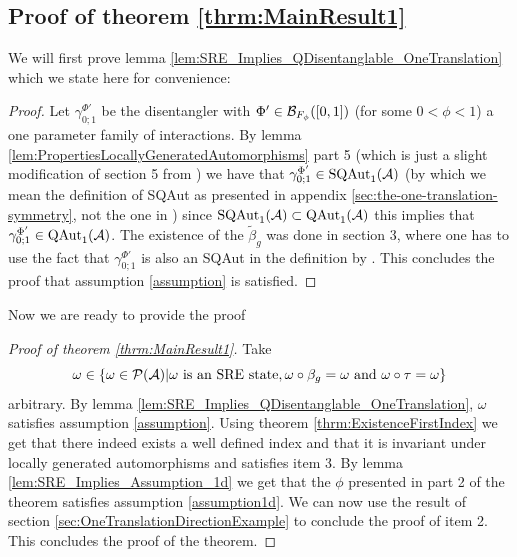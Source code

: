 \documentclass[12pt,a4paper,twoside]{article}
\numberwithin{equation}{section}
\begin{document}
\subsection{Proof of theorem \ref{thrm:MainResult1}}\label{sec:ProofOfMainResult1}
We will first prove lemma \ref{lem:SRE_Implies_QDisentanglable_OneTranslation} which we state here for convenience:
\SREImpliesQDisentanglableOneTranslation*
\begin{proof}
	Let $\gamma^{\Phi'}_{0;1}$ be the disentangler with $\Phi'\in\BB_{F_\phi}([0,1])$ (for some $0<\phi<1$) a one parameter family of interactions. By lemma \ref{lem:PropertiesLocallyGeneratedAutomorphisms} part 5 (which is just a slight modification of section 5 from \cite{ogata2021h3gmathbb}) we have that $\gamma^{\Phi'}_{0;1}\in\textrm{SQAut}_1(\AA)$ (by which we mean the definition of SQAut as presented in appendix \ref{sec:the-one-translation-symmetry}, not the one in \cite{ogata2021h3gmathbb}) since $\textrm{SQAut}_1(\AA)\subset\QAut{\AA}$ this implies that $\gamma^{\Phi'}_{0;1}\in\QAut{\AA}$. The existence of the $\tilde{\beta}_g$ was done in \cite{ogata2021h3gmathbb} section 3, where one has to use the fact that $\gamma^{\Phi'}_{0;1}$ is also an SQAut in the definition by \cite{ogata2021h3gmathbb}. This concludes the proof that assumption \ref{assumption} is satisfied.
\end{proof}
Now we are ready to provide the proof
\begin{proof}[Proof of theorem \ref{thrm:MainResult1}]
	Take
	\begin{equation}
	\omega\in \{\omega\in\PP(\AA)|\omega\text{ is an SRE state},\omega\circ\beta_g=\omega\text{ and }\omega\circ\tau=\omega\}
	\end{equation}
	arbitrary. By lemma \ref{lem:SRE_Implies_QDisentanglable_OneTranslation}, $\omega$ satisfies assumption \ref{assumption}. Using theorem \ref{thrm:ExistenceFirstIndex} we get that there indeed exists a well defined index and that it is invariant under locally generated automorphisms and satisfies item 3. By lemma \ref{lem:SRE_Implies_Assumption_1d} we get that the $\phi$ presented in part 2 of the theorem satisfies assumption \ref{assumption1d}. We can now use the result of section \ref{sec:OneTranslationDirectionExample} to conclude the proof of item 2. This concludes the proof of the theorem.
\end{proof}

\end{document}
